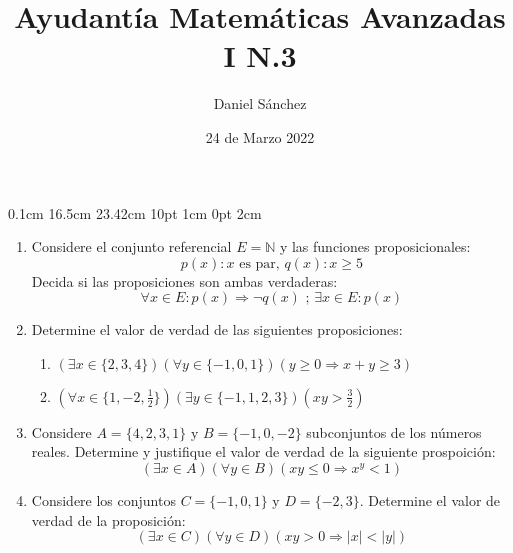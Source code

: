 \documentclass[12pt]{article}
\begin{document}
\setmargins{2.5cm}
{0.1cm}
{16.5cm}
{23.42cm}
{10pt}
{1cm}
{0pt}
{2cm}

\title{Ayudant\'ia Matem\'aticas Avanzadas I N.3}
\date{24 de Marzo 2022}
\author{Daniel S\'anchez}
\maketitle

\begin{enumerate}
    \item Considere el conjunto referencial $E=\mathbb{N}$ y las funciones proposicionales:
          $$p(x):x\mbox{ es par, } q(x):x\geq 5$$
          Decida si las proposiciones son ambas verdaderas:
          $$\forall x \in E: p(x) \Rightarrow \neg q(x)\mbox{ ; } \exists x \in E: p(x)$$
    \item Determine el valor de verdad de las siguientes proposiciones:
          \begin{enumerate}
              \item $(\exists x \in \{2,3,4\})(\forall y \in \{-1,0,1\})(y\geq0 \Rightarrow x+y\geq 3)$
              \item $(\forall x \in \{1,-2,\frac{1}{2}\})(\exists y \in \{-1,1,2,3\})(xy > \frac{3}{2})$
          \end{enumerate}
    \item Considere $A=\{4,2,3,1\} \mbox{ y } B=\{-1,0,-2\}$ subconjuntos de los n\'umeros reales. Determine y justifique
          el valor de verdad de la siguiente prospoici\'on:
          $$(\exists x \in A)(\forall y \in B)(xy\leq 0 \Rightarrow x^{y}<1)$$
    \item Considere los conjuntos $C=\{-1,0,1\} \mbox{ y } D=\{-2,3\}$. Determine el valor de verdad de la proposici\'on:
          $$(\exists x \in C)(\forall y \in D)(xy>0 \Rightarrow |x|<|y|)$$
\end{enumerate}
\end{document}
